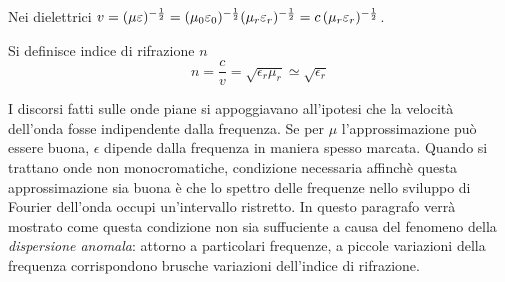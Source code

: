 Nei dielettrici $v=(\mu\varepsilon)^{-\frac{1}{2}}=(\mu_0\varepsilon_0)^{-\frac{1}{2}}(\mu_r\varepsilon_r)^{-\frac{1}{2}}=c\,(\mu_r\varepsilon_r)^{-\frac{1}{2}}$.
\begin{defn}
    Si definisce indice di rifrazione $n$
    \[
        n=\frac{c}{v}=\sqrt{\epsilon_r\mu_r}\simeq \sqrt{\epsilon_r}
    \]
\end{defn}
I discorsi fatti sulle onde piane si appoggiavano all'ipotesi che la velocità dell'onda fosse indipendente dalla
frequenza. Se per $\mu$ l'approssimazione può essere buona, $\epsilon$ dipende dalla frequenza in maniera spesso marcata.
Quando si trattano onde non monocromatiche, condizione necessaria affinchè questa approssimazione sia buona è che
lo spettro delle frequenze nello sviluppo di Fourier dell'onda occupi un'intervallo ristretto. In questo
paragrafo verrà mostrato come questa condizione non sia suffuciente a causa del fenomeno della \textit{dispersione anomala}:
attorno a particolari frequenze, a piccole variazioni della frequenza corrispondono brusche variazioni dell'indice di rifrazione.


